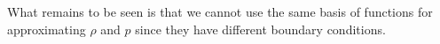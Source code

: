 \documentclass[12pt]{article}
\theoremstyle{definition}
\begin{document}
What remains to be seen is that we cannot use the same basis of functions for approximating $\rho$ and $p$ since they have different boundary conditions.






\end{document}
